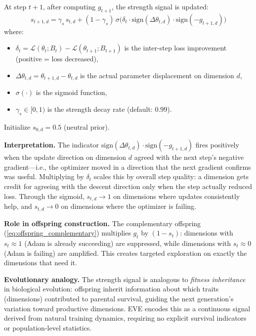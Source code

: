 \documentclass[12pt]{article}
\newcommand{\eqbox}[2]{%
  \begin{tcolorbox}[eqstyle, title={#1}]
    #2
  \end{tcolorbox}
}
\newcommand{\notebox}[1]{%
  \begin{tcolorbox}[notestyle]
    #1
  \end{tcolorbox}
}
\newcommand{\Loss}{\mathcal{L}}
\newcommand{\sign}{\mathrm{sign}}
\begin{document}
\eqbox{Definition 5 \textemdash\ Strength Signal Update}{
At step $t+1$, after computing $g_{t+1}$, the strength signal is updated:
\begin{equation}
  s_{t+1,d} = \gamma_s\, s_{t,d}
    + (1 - \gamma_s)\,\sigma\!\bigl(
      \delta_t \cdot \sign(\Delta\theta_{t,d})
      \cdot \sign(-g_{t+1,d})
    \bigr)
  \label{eq:strength}
\end{equation}
\smallskip
where:
\begin{itemize}[leftmargin=1.6em, itemsep=2pt]
  \item $\delta_t = \Loss(\theta_t; B_t) - \Loss(\theta_{t+1}; B_{t+1})$
    is the inter-step loss improvement (positive = loss decreased),
  \item $\Delta\theta_{t,d} = \theta_{t+1,d} - \theta_{t,d}$ is the
    actual parameter displacement on dimension $d$,
  \item $\sigma(\cdot)$ is the sigmoid function,
  \item $\gamma_s \in [0, 1)$ is the strength decay rate
    (default: $0.99$).
\end{itemize}
Initialize $s_{0,d} = 0.5$ (neutral prior).
}

\textbf{Interpretation.}
The indicator
$\sign(\Delta\theta_{t,d}) \cdot \sign(-g_{t+1,d})$ fires positively
when the update direction on dimension $d$ agreed with the next step's
negative gradient---i.e., the optimizer moved in a direction that the
next gradient confirms was useful.
Multiplying by $\delta_t$ scales this by overall step quality: a
dimension gets credit for agreeing with the descent direction only
when the step actually reduced loss.
Through the sigmoid, $s_{t,d} \to 1$ on dimensions where updates
consistently help, and $s_{t,d} \to 0$ on dimensions where the
optimizer is failing.

\textbf{Role in offspring construction.}
The complementary offspring (\cref{eq:offspring_complementary})
multiplies $g_t$ by $(1 - s_t)$: dimensions with $s_t \approx 1$
(Adam is already succeeding) are suppressed, while dimensions with
$s_t \approx 0$ (Adam is failing) are amplified.
This creates targeted exploration on exactly the dimensions that need it.

\notebox{%
\textbf{Evolutionary analogy.}
The strength signal is analogous to \emph{fitness inheritance} in
biological evolution: offspring inherit information about which traits
(dimensions) contributed to parental survival, guiding the next
generation's variation toward productive dimensions.
EVE encodes this as a continuous signal derived from natural training
dynamics, requiring no explicit survival indicators or population-level
statistics.
}
\end{document}
